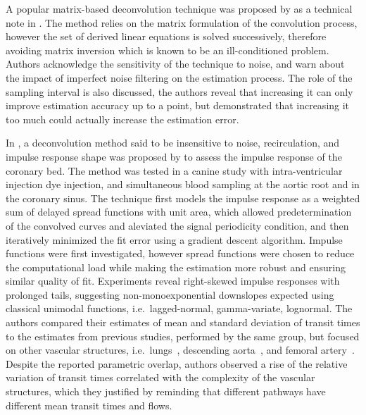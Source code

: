 A popular matrix-based deconvolution technique was proposed by \citet{Valentinuzzi:1975tr} as a technical note in \citeyear{Valentinuzzi:1975tr}. 
The method relies on the matrix formulation of the convolution process, however the set of derived linear equations is solved successively, therefore avoiding matrix inversion which is known to be an ill-conditioned problem. 
Authors acknowledge the sensitivity of the technique to noise, and warn about the impact of imperfect noise filtering on the estimation process. 
The role of the sampling interval is also discussed, the authors reveal that increasing it can only improve estimation accuracy up to a point, but demonstrated that increasing it too much could actually increase the estimation error.

In \citeyear{Knopp:1976uc}, a deconvolution method said to be insensitive to noise, recirculation, and impulse response shape was proposed by \citet{Knopp:1976uc} to assess the impulse response of the coronary bed.
The method was tested in a canine study with intra-ventricular injection dye injection, and simultaneous blood sampling at the aortic root and in the coronary sinus.
The technique first models the impulse response as a weighted sum of delayed spread functions with unit area, which allowed predetermination of the convolved curves and aleviated the signal periodicity condition, and then iteratively minimized the fit error using a gradient descent algorithm.
Impulse functions were first investigated, however spread functions were chosen to reduce the computational load while making the estimation more robust and ensuring similar quality of fit.
Experiments reveal right-skewed impulse responses with prolonged tails, suggesting non-monoexponential downslopes expected using classical unimodal functions, i.e.~lagged-normal, gamma-variate, lognormal.
The authors compared their estimates of mean and standard deviation of transit times to the estimates from previous studies, performed by the same group, but focused on other vascular structures, i.e.~lungs~\cite{Knopp:1969tu}, descending aorta~\cite{Bassingthwaighte:1967vy}, and femoral artery~\cite{Bassingthwaighte:1966jn}. 
Despite the reported parametric overlap, authors observed a rise of the relative variation of transit times correlated with the complexity of the vascular structures, which they justified by reminding that different pathways have different mean transit times and flows.

